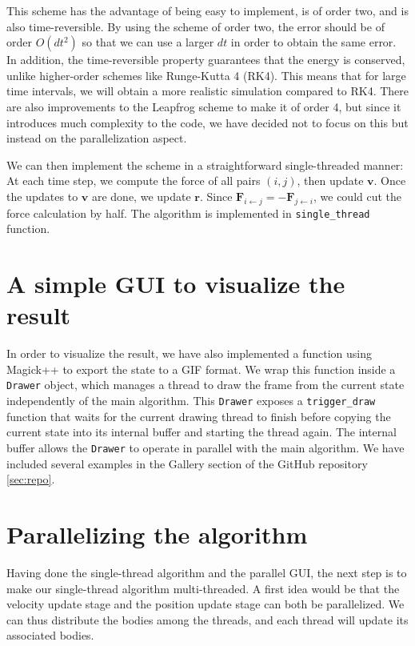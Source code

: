 \documentclass[12pt]{article}
\begin{document}
This scheme has the advantage of being easy to implement, is of order two, and is also time-reversible. By using the scheme of order two, the error should be of order $O(dt^2)$ so that we can use a larger $dt$ in order to obtain the same error. In addition, the time-reversible property guarantees that the energy is conserved, unlike higher-order schemes like Runge-Kutta 4 (RK4). This means that for large time intervals, we will obtain a more realistic simulation compared to RK4. There are also improvements to the Leapfrog scheme to make it of order 4, but since it introduces much complexity to the code, we have decided not to focus on this but instead on the parallelization aspect.

We can then implement the scheme in a straightforward single-threaded manner: At each time step, we compute the force of all pairs $(i, j)$, then update $\boldsymbol{v}$. Once the updates to $\boldsymbol{v}$ are done, we update $\boldsymbol{r}$. Since $\boldsymbol{F}_{i \gets j} = -\boldsymbol{F}_{j \gets i}$, we could cut the force calculation by half. The algorithm is implemented in \verb|single_thread| function.

\section{A simple GUI to visualize the result}
In order to visualize the result, we have also implemented a function using Magick++ to export the state to a GIF format. We wrap this function inside a \verb|Drawer| object, which manages a thread to draw the frame from the current state independently of the main algorithm. This \verb|Drawer| exposes a \verb|trigger_draw| function that waits for the current drawing thread to finish before copying the current state into its internal buffer and starting the thread again. The internal buffer allows the \verb|Drawer| to operate in parallel with the main algorithm. We have included several examples in the Gallery section of the GitHub repository \ref{sec:repo}.

\section{Parallelizing the algorithm}
Having done the single-thread algorithm and the parallel GUI, the next step is to make our single-thread algorithm multi-threaded. A first idea would be that the velocity update stage and the position update stage can both be parallelized. We can thus distribute the bodies among the threads, and each thread will update its associated bodies. 
\end{document}

